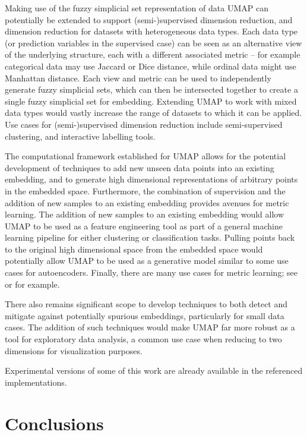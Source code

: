 \documentclass[12pt]{article}
\begin{document}
Making use of the fuzzy simplicial set representation of data UMAP can potentially be extended to support (semi-)supervised dimension reduction, and dimension reduction for datasets with heterogeneous data types. Each data type (or prediction variables in the supervised case) can be seen as an alternative view of the underlying structure, each with a different associated metric -- for example categorical data may use Jaccard or Dice distance, while ordinal data might use Manhattan distance. Each view and metric can be used to independently generate fuzzy simplicial sets, which can then be intersected together to create a single fuzzy simplicial set for embedding. Extending UMAP to work with mixed data types would vastly increase the range of datasets to which it can be applied. Use cases for (semi-)supervised dimension reduction include semi-supervised clustering, and interactive labelling tools. 

The computational framework established for UMAP allows for the potential development of techniques to add new unseen data points into an existing embedding, and to generate high dimensional representations of arbitrary points in the embedded space. Furthermore, the combination of supervision and the addition of new samples to an existing embedding provides avenues for metric learning. The addition of new samples to an existing embedding would allow UMAP to be used as a feature engineering tool as part of a general machine learning pipeline for either clustering or classification tasks. Pulling points back to the original high dimensional space from the embedded space would potentially allow UMAP to be used as a generative model similar to some use cases for autoencoders. Finally, there are many use cases for metric learning; see \cite{yang2006distance} or \cite{bellet2013survey} for example.

There also remains significant scope to develop techniques to both detect and mitigate against potentially spurious embeddings, particularly for small data cases. The addition of such techniques would make UMAP far more robust as a tool for exploratory data analysis, a common use case when reducing to two dimensions for visualization purposes.

Experimental versions of some of this work are already available in the referenced implementations.

\section{Conclusions}
\end{document}
